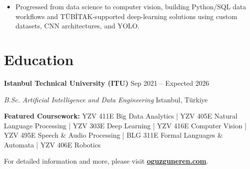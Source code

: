 \documentclass[a4paper,10pt]{article}
\begin{document}
\begin{itemize}
    \item Progressed from data science to computer vision, building Python/SQL data workflows and TÜBİTAK-supported deep-learning solutions using custom datasets, CNN architectures, and YOLO.
\end{itemize}


\section{Education}

\textbf{Istanbul Technical University (ITU)}
\hfill
Sep 2021 -- Expected 2026

\textit{B.Sc. Artificial Intelligence and Data Engineering}
\hfill
Istanbul, Türkiye

\vspace{1pt}
{\small
\textbf{Featured Coursework:} YZV 411E Big Data Analytics | YZV 405E Natural Language Processing | YZV 303E Deep Learning | YZV 416E Computer Vision | YZV 495E Speech \& Audio Processing | BLG 311E Formal Languages \& Automata | YZV 406E Robotics
}
\vspace{1pt}







\begin{center}
\small
For detailed information and more, please visit
\href{https://www.oguzguneren.com}{\textbf{oguzguneren.com}}.
\end{center}
\end{document}
